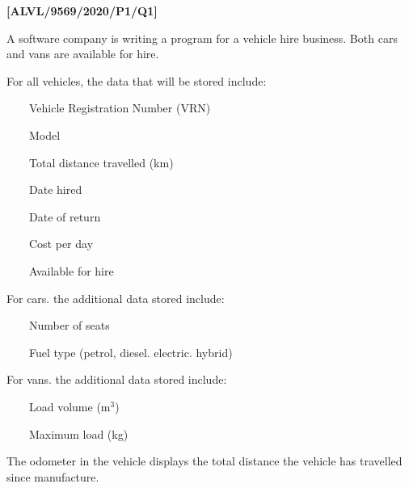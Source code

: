 \item \textbf{{[}ALVL/9569/2020/P1/Q1{]} }

A software company is writing a program for a vehicle hire business.
Both cars and vans are available for hire. 

For all vehicles, the data that will be stored include: 

\begin{singlespace}
~~~~Vehicle Registration Number (VRN) 

~~~~Model 

~~~~Total distance travelled (km) 

~~~~Date hired 

~~~~Date of return 

~~~~Cost per day 

~~~~Available for hire 
\end{singlespace}

For cars. the additional data stored include: 

\begin{singlespace}
~~~~Number of seats 

~~~~Fuel type (petrol, diesel. electric. hybrid) 
\end{singlespace}

For vans. the additional data stored include: 

\begin{singlespace}
~~~~Load volume ($\text{m}^{3}$) 

~~~~Maximum load (kg) 
\end{singlespace}

The odometer in the vehicle displays the total distance the vehicle
has travelled since manufacture. 

